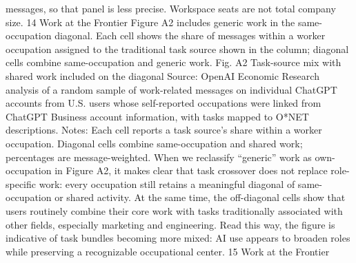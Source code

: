 messages, so that panel is less precise. Workspace seats are not total company size.
14
Work at the Frontier
Figure A2 includes generic work in the same-occupation diagonal. Each cell shows the share of messages
within a worker occupation assigned to the traditional task source shown in the column; diagonal cells
combine same-occupation and generic work.
Fig. A2
Task-source mix with shared work included on the diagonal
Source: OpenAI Economic Research analysis of a random sample of work-related messages on individual ChatGPT accounts
from U.S. users whose self-reported occupations were linked from ChatGPT Business account information, with tasks mapped
to O*NET descriptions. Notes: Each cell reports a task source’s share within a worker occupation. Diagonal cells combine
same-occupation and shared work; percentages are message-weighted.
When we reclassify “generic” work as own-occupation in Figure A2, it makes clear that task crossover
does not replace role-specific work: every occupation still retains a meaningful diagonal of same-occupation
or shared activity. At the same time, the off-diagonal cells show that users routinely combine their core
work with tasks traditionally associated with other fields, especially marketing and engineering. Read this
way, the figure is indicative of task bundles becoming more mixed: AI use appears to broaden roles while
preserving a recognizable occupational center.
15
Work at the Frontier


